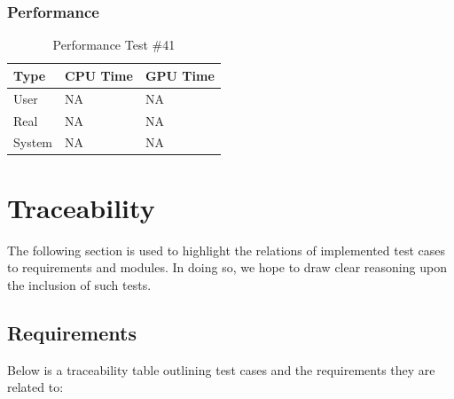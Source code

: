 \documentclass[12pt]{article}
\begin{document}
	\subsubsection{Performance}
		\begin{table}[!htbp]
		\centering
		\caption{Performance Test \#41}\label{_acc}
		\begin{tabular}{lll}
		\toprule
		Type&CPU Time& GPU Time\\\midrule
		User&NA&NA\\
		Real&NA&NA\\
		System&NA&NA\\
		\end{tabular}
		\end{table}
\section{Traceability}
The following section is used to highlight the relations of implemented test cases to requirements and modules. In doing so, we hope to draw clear reasoning upon the inclusion of such tests. 
\subsection{Requirements}
Below is a traceability table outlining test cases and the requirements they are related to:\\
\end{document}
